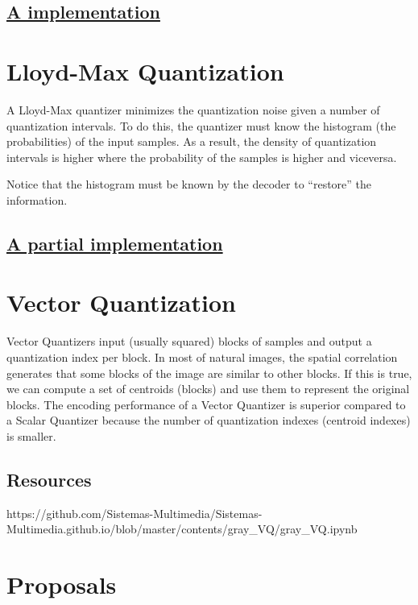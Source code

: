 \subsection*{\href{https://github.com/Sistemas-Multimedia/VCF/blob/main/src/deadzone.py}{A implementation}}

\section{Lloyd-Max Quantization}

A Lloyd-Max quantizer minimizes the quantization noise given a number
of quantization intervals. To do this, the quantizer must know the
histogram (the probabilities) of the input samples. As a result, the
density of quantization intervals is higher where the probability of
the samples is higher and viceversa.

Notice that the histogram must be known by the decoder to ``restore''
the information.

\subsection*{\href{https://github.com/Sistemas-Multimedia/VCF/blob/main/src/LloydMax.py}{A partial implementation}}

\section{Vector Quantization}

Vector Quantizers input (usually squared) blocks of samples and output
a quantization index per block. In most of natural images, the spatial
correlation generates that some blocks of the image are similar to
other blocks. If this is true, we can compute a set of centroids
(blocks) and use them to represent the original blocks. The encoding
performance of a Vector Quantizer is superior compared to a Scalar
Quantizer because the number of quantization indexes (centroid
indexes) is smaller.

\subsection*{Resources}

https://github.com/Sistemas-Multimedia/Sistemas-Multimedia.github.io/blob/master/contents/gray_VQ/gray_VQ.ipynb

\section{Proposals}
